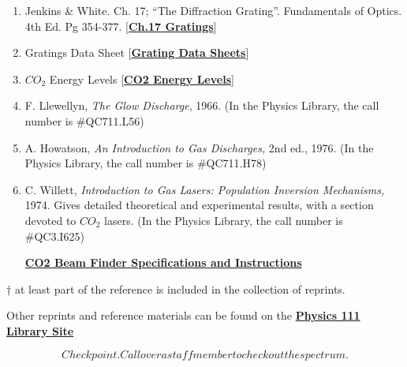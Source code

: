 \documentclass{../lab}
\begin{document}
\begin{enumerate}
    \item Jenkins \& White. Ch. 17; ``The Diffraction Grating''. Fundamentals of Optics. 4th Ed. Pg 354-377. [\href{http://physics111.lib.berkeley.edu/Physics111/Reprints/CO2/OCR\%20ch.\%2017\%20the\%20diffraction\%20grating.pdf}{\textbf{Ch.17 Gratings}}]
    \item Gratings Data Sheet [\href{http://physics111.lib.berkeley.edu/Physics111/Reprints/CO2/grating.pdf}{\textbf{Grating Data Sheets}}]
    \item $CO_2 $ Energy Levels [\href{http://physics111.lib.berkeley.edu/Physics111/Reprints/CO2/CO\_2\%20Energy\%20Levels.pdf}{\textbf{CO2 Energy Levels}}]
    \item F. Llewellyn, \emph{The Glow Discharge}, 1966. (In the Physics Library, the call number is \#QC711.L56)
    \item A. Howatson, \emph{An Introduction to Gas Discharges,} 2nd ed., 1976.  (In the Physics Library, the call number is \#QC711.H78)
    \item C. Willett, \emph{Introduction to Gas Lasers: Population Inversion Mechanisms,} 1974. Gives detailed theoretical and experimental results, with a section devoted to $CO_2 $ lasers.  (In the Physics Library, the call number is \#QC3.I625)
    \item [\href{http://physics111.lib.berkeley.edu/Physics111/Reprints/CO2/CO2\_beam\_finder\_instructions.pdf}{\textbf{CO2 Beam Finder Specifications and Instructions}}]
\end{enumerate}

† at least part of the reference is included in the collection of reprints.


Other reprints and reference materials can be found on the \href{http://physics111.lib.berkeley.edu/Physics111/Reprints/CO2/CO2\_index.html}{\textbf{Physics 111 Library Site}}

\begin{equation}
    Checkpoint. Call over a staff member to check out the spectrum.
\end{equation}
\end{document}

